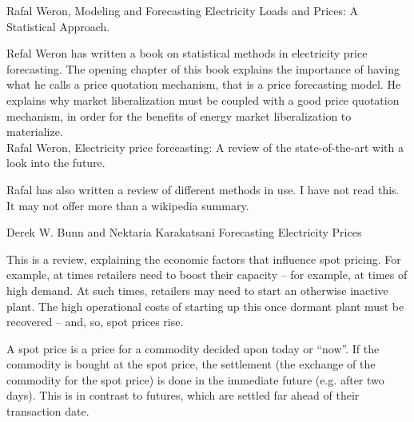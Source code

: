 \documentclass[a4paper]{article}
\begin{document}
Rafal Weron, Modeling and Forecasting Electricity Loads and Prices: A Statistical Approach.

Refal Weron has written a book on statistical methods in electricity price forecasting. The opening chapter of this book explains the importance of having what he calls a price quotation mechanism, that is a price forecasting model. He explains why market liberalization must be coupled with a good price quotation mechanism, in order for the benefits of energy market liberalization to materialize. \\

\breathe
Rafal Weron, Electricity price forecasting: A review of the state-of-the-art with a look into the future.

Rafal has also written a review of different methods in use. I have not read this. It may not offer more than a wikipedia summary.

\breathe

Derek W. Bunn and Nektaria Karakatsani
Forecasting Electricity Prices 

This is a review, explaining the economic factors that influence spot pricing. For example, at times retailers need to boost their capacity -- for example, at times of high demand. At such times, retailers may need to start an otherwise inactive plant. The high operational costs of starting up this once dormant plant must be recovered -- and, so, spot prices rise. 

\begin{definition}
    A spot price is a price for a commodity decided upon today or ``now''. If the commodity is bought at the spot price, the settlement (the exchange of the commodity for the spot price) is done in the immediate future (e.g. after two days). This is in contrast to futures, which are settled far ahead of their transaction date.
\end{definition}
\end{document}
